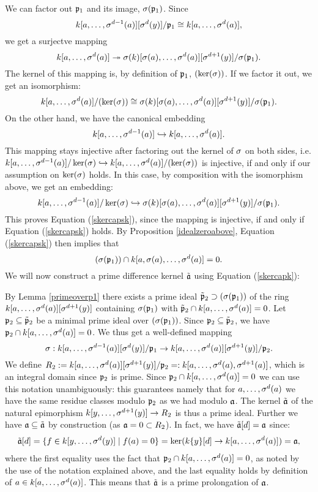\begin{prop}
\begin{bew}
We can factor out $\mathfrak{p}_1$ and its image, $\sigma(\mathfrak{p}_1)$. Since $$k[a,\ldots,\sigma^{d-1}(a)][\sigma^d(y)] / \mathfrak{p}_1 \cong k[a,\ldots, \sigma^d(a)],$$
we get a surjectve mapping $$k[a,\ldots, \sigma^d(a)] \twoheadrightarrow \sigma(k)[\sigma(a),\ldots,\sigma^d(a)][\sigma^{d+1}(y)]/\sigma(\mathfrak{p}_1).$$
The kernel of this mapping is, by definition of $\mathfrak{p}_1$, $(\ker(\sigma))$. If we factor it out, we get an isomorphism:
\[ k[a,\ldots, \sigma^d(a)]/(\operatorname{ker}(\sigma)) \cong \sigma(k)[\sigma(a),\ldots,\sigma^d(a)][\sigma^{d+1}(y)]/\sigma(\mathfrak{p}_1). \]
On the other hand, we have the canonical embedding $$k[a,\ldots,\sigma^{d-1}(a)] \hookrightarrow k[a,\ldots,\sigma^{d}(a)].$$
This mapping stays injective after factoring out the kernel of $\sigma$ on both sides, 
i.e. $k[a,\ldots,\sigma^{d-1}(a)]/\operatorname{ker}(\sigma) \hookrightarrow k[a,\ldots,\sigma^{d}(a)]/(\operatorname{ker}(\sigma))$ is injective, if and only if our assumption on $\ker(\sigma)$ holds.
In this case, by composition with the isomorphism above, we get an embedding:
\[ k[a,\ldots,\sigma^{d-1}(a)]/\operatorname{ker}(\sigma) \hookrightarrow \sigma(k)[\sigma(a),\ldots,\sigma^d(a)][\sigma^{d+1}(y)]/\sigma(\mathfrak{p}_1). \]
This proves Equation (\ref{skercapsk}), since the mapping is injective, if and only if Equation (\ref{skercapsk}) holds.
By Proposition \ref{idealzeroabove}, Equation (\ref{skercapsk}) then implies that
\begin{equation}\label{skercapk}
(\sigma(\mathfrak{p}_1)) \cap k[a,\sigma(a),\ldots,\sigma^d(a)]
 = 0.
\end{equation}
We will now construct a prime difference kernel $\tilde {\mathfrak{a}}$ using Equation (\ref{skercapk}):

By Lemma \ref{primeoverp1} there exists a prime ideal $\tilde {\mathfrak{p}}_2 \supset (\sigma(\mathfrak{p}_1))$ of the ring $k[a,\ldots,\sigma^d(a)][\sigma^{d+1}(y)]$ containing $\sigma(\mathfrak{p}_1)$ with $\tilde {\mathfrak{p}}_2 \cap k[a,\ldots,\sigma^d(a)] = 0$. 
Let $\mathfrak{p}_2 \subseteq \tilde {\mathfrak{p}}_2$ be a minimal prime ideal over $(\sigma(\mathfrak{p}_1))$. Since $\mathfrak{p}_2 \subseteq \tilde {\mathfrak{p}}_2$, we have $\mathfrak{p}_2 \cap k[a,\ldots,\sigma^d(a)] = 0$.
We thus get a well-defined mapping
\[ \sigma: k[a,\ldots,\sigma^{d-1}(a)][\sigma^d(y)]/\mathfrak{p}_1 \rightarrow k[a,\ldots, \sigma^d(a)][\sigma^{d+1}(y)]/\mathfrak{p}_2. \]
We define $R_2:= k[a,\ldots,\sigma^d(a)][\sigma^{d+1}(y)]/\mathfrak{p}_2 =: k[a,\ldots,\sigma^d(a),\sigma^{d+1}(a)]$, which is an integral domain since $\mathfrak{p}_2$ is prime. Since $\mathfrak{p}_2 \cap k[a,\ldots,\sigma^d(a)] = 0$ we can use this notation unambiguously:
this guarantees namely that for $a, \ldots, \sigma^d(a)$ we have the same residue classes modulo $\mathfrak{p}_2$ as we had modulo $\mathfrak{a}$.
The kernel $\tilde {\mathfrak{a}}$ of the natural epimorphism $k[y,\ldots,\sigma^{d+1}(y)] \rightarrow R_2$ is thus a prime ideal.
Further we have $\mathfrak{a} \subseteq \tilde {\mathfrak{a}}$ by construction (as $\mathfrak{a} = 0 \subset R_2$). In fact, we have $\tilde {\mathfrak{a}}[d] = \mathfrak{a}$ since: 
\begin{align*}
\tilde {\mathfrak{a}}[d] = \{ f \in k[y,\ldots,\sigma^d(y)] \mid f(a) = 0 \} = \ker( k\{y\}[d] \rightarrow k[a,\ldots,\sigma^{d}(a)]) = \mathfrak{a},
\end{align*}
where the first equality uses the fact that $\mathfrak{p}_2 \cap k[a,\ldots,\sigma^d(a)] = 0$, as noted by the use of the notation explained above, and the last equality holds by definition of $a \in k[a,\ldots,\sigma^d(a)]$. This means that $\tilde {\mathfrak{a}}$ is a prime prolongation of $\mathfrak{a}$. \\


\end{bew}
\end{prop}
